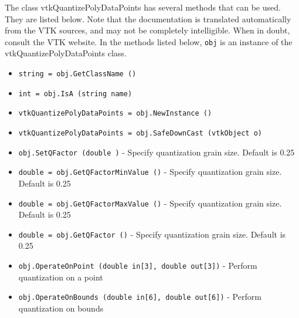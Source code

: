 The class vtkQuantizePolyDataPoints has several methods that can be used.
  They are listed below.
Note that the documentation is translated automatically from the VTK sources,
and may not be completely intelligible.  When in doubt, consult the VTK website.
In the methods listed below, \verb|obj| is an instance of the vtkQuantizePolyDataPoints class.
\begin{itemize}
\item  \verb|string = obj.GetClassName ()|

\item  \verb|int = obj.IsA (string name)|

\item  \verb|vtkQuantizePolyDataPoints = obj.NewInstance ()|

\item  \verb|vtkQuantizePolyDataPoints = obj.SafeDownCast (vtkObject o)|

\item  \verb|obj.SetQFactor (double )| -  Specify quantization grain size. Default is 0.25

\item  \verb|double = obj.GetQFactorMinValue ()| -  Specify quantization grain size. Default is 0.25

\item  \verb|double = obj.GetQFactorMaxValue ()| -  Specify quantization grain size. Default is 0.25

\item  \verb|double = obj.GetQFactor ()| -  Specify quantization grain size. Default is 0.25

\item  \verb|obj.OperateOnPoint (double in[3], double out[3])| -  Perform quantization on a point

\item  \verb|obj.OperateOnBounds (double in[6], double out[6])| -  Perform quantization on bounds

\end{itemize}
